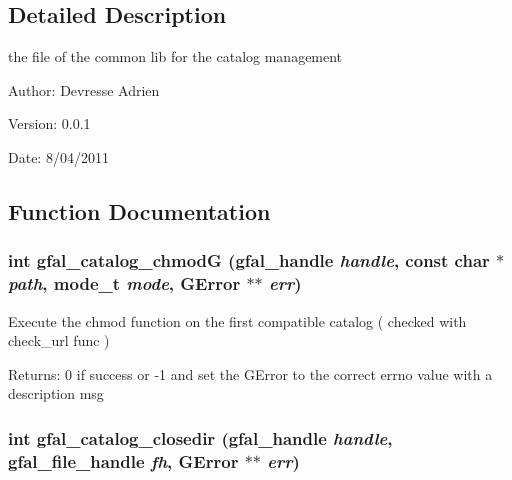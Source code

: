 \subsection{Detailed Description}
the file of the common lib for the catalog management 

\begin{Desc}
\item[Author:]Devresse Adrien \end{Desc}
\begin{Desc}
\item[Version:]0.0.1 \end{Desc}
\begin{Desc}
\item[Date:]8/04/2011 \end{Desc}


\subsection{Function Documentation}
\subsubsection{\setlength{\rightskip}{0pt plus 5cm}int gfal\_\-catalog\_\-chmod\-G (gfal\_\-handle {\em handle}, const char $\ast$ {\em path}, mode\_\-t {\em mode}, GError $\ast$$\ast$ {\em err})}\label{gfal__common__catalog_8c_12b613d1db9c17e70e679ef7285f6a6f}


Execute the chmod function on the first compatible catalog ( checked with check\_\-url func ) \begin{Desc}
\item[Returns:]0 if success or -1 and set the GError to the correct errno value with a description msg \end{Desc}
\subsubsection{\setlength{\rightskip}{0pt plus 5cm}int gfal\_\-catalog\_\-closedir (gfal\_\-handle {\em handle}, gfal\_\-file\_\-handle {\em fh}, GError $\ast$$\ast$ {\em err})}\label{gfal__common__catalog_8c_51ecb1a0e6125b0b72ad42b834046bb1}


